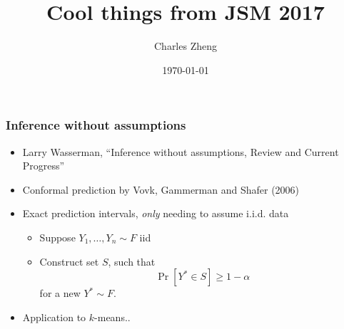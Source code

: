 \documentclass{beamer}
\title[JSM 2017]{Cool things from JSM 2017}
\author{Charles Zheng} %
\institute[NIMH] %
{National Institute of Mental Health}
\date{\today} %
\begin{document}
\begin{frame}
\titlepage %
\end{frame}

\begin{frame}
\frametitle{Inference without assumptions}
\begin{itemize}
\item Larry Wasserman, ``Inference without assumptions, Review and Current Progress''
\item Conformal prediction by Vovk, Gammerman and Shafer (2006) \pause
\item Exact prediction intervals, \emph{only} needing to assume i.i.d. data
\begin{itemize}
\item Suppose $Y_1,\hdots, Y_n \sim F$ iid
\item Construct set $S$, such that
\[
\Pr[Y^* \in S] \geq 1 -\alpha
\]
for a new $Y^* \sim F$.
\end{itemize}
\pause
\item Application to $k$-means..
\end{itemize}
\end{frame}
\end{document}

